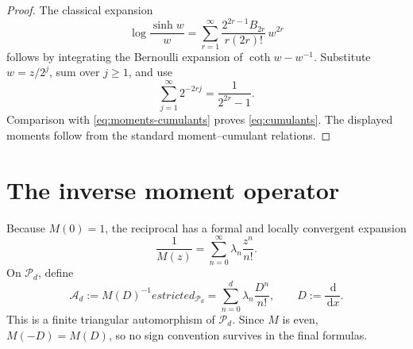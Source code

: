 \documentclass[11pt,oneside]{book}
\theoremstyle{definition}
\theoremstyle{remark}
\newcommand{\Pp}{\mathcal P}
\newcommand{\Aop}{\mathcal A}
\newcommand{\dd}{\,\mathrm d}
\begin{document}
\begin{proof}
The classical expansion
\[
 \log\frac{\sinh w}{w}
 =\sum_{r=1}^{\infty}
 \frac{2^{2r-1}B_{2r}}{r(2r)!}\,w^{2r}
\]
follows by integrating the Bernoulli expansion of \(\coth w-w^{-1}\).  Substitute \(w=z/2^j\), sum over \(j\ge1\), and use
\[
 \sum_{j=1}^{\infty}2^{-2rj}=\frac1{2^{2r}-1}.
\]
Comparison with \cref{eq:moments-cumulants} proves \cref{eq:cumulants}.  The displayed moments follow from the standard moment--cumulant relations.
\end{proof}

\section{The inverse moment operator}
Because \(M(0)=1\), the reciprocal has a formal and locally convergent expansion
\begin{equation}
 \frac1{M(z)}=\sum_{n=0}^{\infty}\lambda_n\frac{z^n}{n!}.
 \label{eq:inverse-moments}
\end{equation}
On \(\Pp_d\), define
\begin{equation}
 \Aop_d:=M(D)^{-1}
estricted_{\Pp_d}
 =\sum_{n=0}^{d}\lambda_n\frac{D^n}{n!},
 \qquad D:=\frac{\dd}{\dd x}.
 \label{eq:inverse-moment-operator}
\end{equation}
This is a finite triangular automorphism of \(\Pp_d\).  Since \(M\) is even, \(M(-D)=M(D)\), so no sign convention survives in the final formulas.
\end{document}
